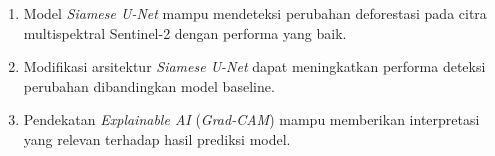 \begin{enumerate}
    \item Model \textit{Siamese U-Net} mampu mendeteksi perubahan deforestasi pada citra multispektral Sentinel-2 dengan performa yang baik.

    \item Modifikasi arsitektur \textit{Siamese U-Net} dapat meningkatkan performa deteksi perubahan dibandingkan model baseline.

    \item Pendekatan \textit{Explainable AI} (\textit{Grad-CAM}) mampu memberikan interpretasi yang relevan terhadap hasil prediksi model.
\end{enumerate}
